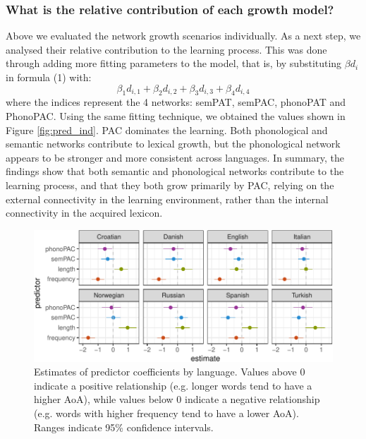 \documentclass[10pt, letterpaper]{article}
\newenvironment{CodeChunk}{}{}
\begin{document}
\subsubsection{What is the relative contribution of each growth
model?}\label{what-is-the-relative-contribution-of-each-growth-model}

Above we evaluated the network growth scenarios individually. As a next
step, we analysed their relative contribution to the learning process.
This was done through adding more fitting parameters to the model, that
is, by substituting \(\beta d_i\) in formula (1) with:
\[\beta_{1} d_{i, 1} + \beta_{2} d_{i, 2} + \beta_{3} d_{i, 3} + \beta_{4} d_{i, 4}\]
where the indices represent the 4 networks: semPAT, semPAC, phonoPAT and
PhonoPAC. Using the same fitting technique, we obtained the values shown
in Figure \ref{fig:pred_ind}. PAC dominates the learning. Both
phonological and semantic networks contribute to lexical growth, but the
phonological network appears to be stronger and more consistent across
languages. In summary, the findings show that both semantic and
phonological networks contribute to the learning process, and that they
both grow primarily by PAC, relying on the external connectivity in the
learning environment, rather than the internal connectivity in the
acquired lexicon.

\begin{CodeChunk}
\begin{figure}[h]

{\centering \includegraphics{figs/regressions_img-1} 

}

\caption{\label{fig:regressions_img}Estimates of predictor coefficients by language. Values above 0 indicate a positive relationship (e.g. longer words tend to have a higher AoA), while values below 0 indicate a negative relationship (e.g. words with higher frequency tend to have a lower AoA). Ranges indicate 95\% confidence intervals.}\label{fig:regressions_img}
\end{figure}
\end{CodeChunk}
\end{document}
